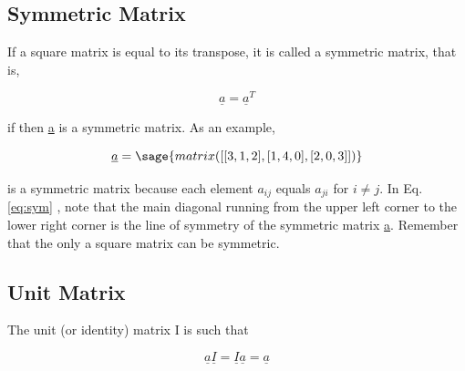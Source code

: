 \documentclass[12pt]{report}
\newcommand{\lab}[1]{
	Eq.\ref{#1}
}
\begin{document}

\subsection{Symmetric Matrix}

If a square matrix is equal to its transpose, it is called a symmetric
matrix, that is,

\begin{equation}
	\underline{a} = \underline{a}^T
\end{equation}

 if then \underline{a} is a symmetric matrix. As an
example,

\begin{equation}
	\underline{a}=\sage{matrix([[3,1,2],[1,4,0],[2,0,3]])}
	\label{eq:sym}
\end{equation}

is a symmetric matrix because each element $a_{{ij}}$ equals $a_{{ji}}$ for $i
\neq j$. In \lab{eq:sym}, note that the main diagonal running from the
upper left corner to the lower right corner is the line of symmetry of
the symmetric matrix \underline{a}. Remember that the only a square
matrix can be symmetric.


\subsection{Unit Matrix}

The unit (or identity) matrix I is such that

\begin{equation}
	\underline{a}\underline{I}=\underline{I}\underline{a}=\underline{a}
\end{equation}
\end{document}

